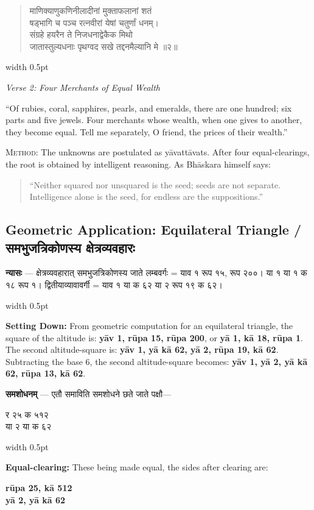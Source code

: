 \documentclass[11pt,a4paper]{article}
\newcommand{\dev}[1]{{\devanagarifont #1}}
\newcommand{\vs}{\vspace{0.5em}}
\newenvironment{sanskritverse}{%
  \begin{quote}\devanagarifont\textcolor{versecolor}%
}{%
  \end{quote}
}
\newcommand{\bilingual}[2]{%
  \par\vspace{0.5em}%
  \noindent\begin{minipage}[t]{0.47\textwidth}%
  \setlength{\parindent}{0pt}%
  \small #1%
  \end{minipage}%
  \hfill\textcolor{columnrule}{\vrule width 0.5pt}\hfill%
  \begin{minipage}[t]{0.47\textwidth}%
  \setlength{\parindent}{0pt}%
  \small\raggedright #2%
  \end{minipage}%
  \par\vspace{0.5em}%
}
\begin{document}
\bilingual{\begin{sanskritverse}
माणिक्याणुकणिनीलादीनां मुक्ताफलानां शतं\\
षड्भागि च पञ्च रत्नवीरां येषां चतुर्णां धनम्।\\
संग्रहे हयरैन ते निजधनाद्वेकैक मिथो\\
जातास्तुल्यधनाः पृथग्वद सखे तद्दनमैल्यानि मे ॥२॥
\end{sanskritverse}
}{%
\begin{flushright}
\textit{Verse 2: Four Merchants of Equal Wealth}
\end{flushright}
``Of rubies, coral, sapphires, pearls, and emeralds, there are one hundred; six parts and five jewels. Four merchants whose wealth, when one gives to another, they become equal. Tell me separately, O friend, the prices of their wealth.''

\vs
\textsc{Method:} The unknowns are postulated as y\={a}vatt\={a}vats. After four equal-clearings, the root is obtained by intelligent reasoning. As Bh\={a}skara himself says:
\begin{quote}
``Neither squared nor unsquared is the seed; seeds are not separate. Intelligence alone is the seed, for endless are the suppositions.''
\end{quote}}

\newpage

\subsection*{Geometric Application: Equilateral Triangle / समभुजत्रिकोणस्य क्षेत्रव्यवहारः}

\bilingual{\textbf{न्यासः} — क्षेत्रव्यवहारात् समभुजत्रिकोणस्य जाते लम्बवर्गः = \dev{याव १ रूप १५, रूप २००}। या १ या १ क १८ रूप १। द्वितीयाव्यावावर्गी = \dev{याव १ या क ६२ या २ रूप १९ क ६२}।
}{%
\textbf{Setting Down:} From geometric computation for an equilateral triangle, the square of the altitude is: \textbf{y\={a}v 1, r\={u}pa 15, r\={u}pa 200}, or \textbf{y\={a} 1, k\={a} 18, r\={u}pa 1}. The second altitude-square is: \textbf{y\={a}v 1, y\={a} k\={a} 62, y\={a} 2, r\={u}pa 19, k\={a} 62}. Subtracting the base 6, the second altitude-square becomes: \textbf{y\={a}v 1, y\={a} 2, y\={a} k\={a} 62, r\={u}pa 13, k\={a} 62}.}

\vs

\bilingual{\textbf{समशोधनम्} — एतौ समाविति समशोधने छते जाते पक्षौ—
\begin{center}\dev{र २५ क ५१२}\\\dev{या २ या क ६२}\end{center}
}{%
\textbf{Equal-clearing:} These being made equal, the sides after clearing are:
\begin{center}\textbf{r\={u}pa 25, k\={a} 512}\\\textbf{y\={a} 2, y\={a} k\={a} 62}\end{center}}
\end{document}
